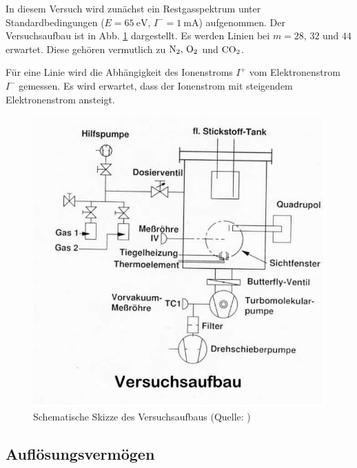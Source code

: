 In diesem Versuch wird zunächst ein Restgasspektrum unter Standardbedingungen ($E=\SI{65}{\electronvolt}, \, I^{-}=\SI{1}{\milli\ampere}$) aufgenommen. Der Versuchsaufbau ist in Abb. \ref{fig0v11} dargestellt.
Es werden Linien bei $m=28,\, 32$ und $44$ erwartet. Diese gehören vermutlich zu $\rm{N}_{2}, \, \rm{O}_{2}$ und $\rm{CO}_{2}$.

Für eine Linie wird die Abhängigkeit des Ionenstroms $I^{+}$ vom Elektronenstrom $I^{-}$ gemessen. Es wird erwartet, dass der Ionenstrom mit steigendem Elektronenstrom ansteigt.

\begin{figure}[tb]
 \centering
 \includegraphics[scale=0.5]{./fig/massenspek_aufbau.png}
 \caption{Schematische Skizze des Versuchsaufbaus (Quelle: \cite[S. 4]{Litmap})}
 \label{fig0v11}
\end{figure}

\subsection{Auflösungsvermögen}

